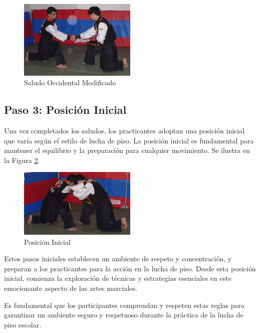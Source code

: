 \begin{figure}[h]
	\centering
	\includegraphics[width=0.5\textwidth]{images/Lucha_de_Piso/02_saludo_mano.png}
	\caption{Saludo Occidental Modificado}
	\label{fig:saludo_occidental_lp}
\end{figure}

\subsection*{Paso 3: Posición Inicial}

Una vez completados los saludos, los practicantes adoptan una posición inicial que varía según el estilo de lucha de piso. La posición inicial es fundamental para mantener el equilibrio y la preparación para cualquier movimiento. Se ilustra en la Figura \ref{fig:posicion_inicial_lp}.

\begin{figure}[h]
	\centering
	\includegraphics[width=0.5\textwidth]{images/Lucha_de_Piso/03_posicion_inicial.png}
	\caption{Posición Inicial}
	\label{fig:posicion_inicial_lp}
\end{figure}

Estos pasos iniciales establecen un ambiente de respeto y concentración, y preparan a los practicantes para la acción en la lucha de piso. Desde esta posición inicial, comienza la exploración de técnicas y estrategias esenciales en este emocionante aspecto de las artes marciales.


Es fundamental que los participantes comprendan y respeten estas reglas para garantizar un ambiente seguro y respetuoso durante la práctica de la lucha de piso escolar.


